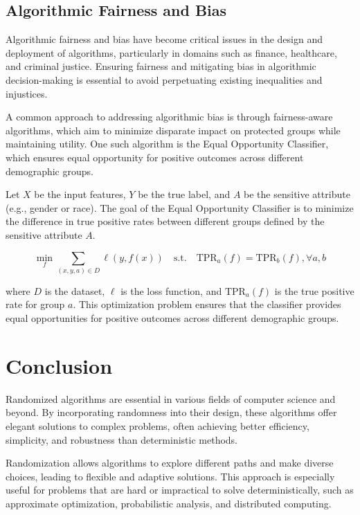 \documentclass[12pt]{book} %
\begin{document}
\subsection{Algorithmic Fairness and Bias}

Algorithmic fairness and bias have become critical issues in the design and deployment of algorithms, particularly in domains such as finance, healthcare, and criminal justice. Ensuring fairness and mitigating bias in algorithmic decision-making is essential to avoid perpetuating existing inequalities and injustices.

A common approach to addressing algorithmic bias is through fairness-aware algorithms, which aim to minimize disparate impact on protected groups while maintaining utility. One such algorithm is the Equal Opportunity Classifier, which ensures equal opportunity for positive outcomes across different demographic groups.

Let \(X\) be the input features, \(Y\) be the true label, and \(A\) be the sensitive attribute (e.g., gender or race). The goal of the Equal Opportunity Classifier is to minimize the difference in true positive rates between different groups defined by the sensitive attribute \(A\).

\[
\min_{f} \sum_{(x,y,a) \in D} \ell(y, f(x)) \quad \text{s.t.} \quad \text{TPR}_a(f) = \text{TPR}_b(f), \forall a, b
\]

where \(D\) is the dataset, \(\ell\) is the loss function, and \(\text{TPR}_a(f)\) is the true positive rate for group \(a\). This optimization problem ensures that the classifier provides equal opportunities for positive outcomes across different demographic groups.


\section{Conclusion}

Randomized algorithms are essential in various fields of computer science and beyond. By incorporating randomness into their design, these algorithms offer elegant solutions to complex problems, often achieving better efficiency, simplicity, and robustness than deterministic methods.

Randomization allows algorithms to explore different paths and make diverse choices, leading to flexible and adaptive solutions. This approach is especially useful for problems that are hard or impractical to solve deterministically, such as approximate optimization, probabilistic analysis, and distributed computing.
\end{document}
